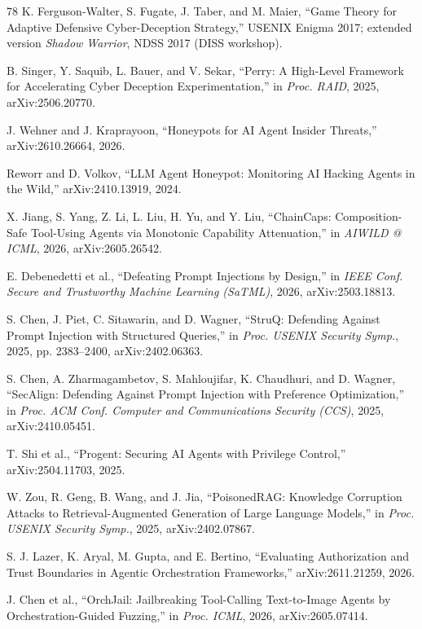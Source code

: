 \begin{thebibliography}{78}
K. Ferguson-Walter, S. Fugate, J. Taber, and M. Maier, ``Game Theory for
Adaptive Defensive Cyber-Deception Strategy,'' USENIX Enigma 2017; extended
version \emph{Shadow Warrior}, NDSS 2017 (DISS workshop).

B. Singer, Y. Saquib, L. Bauer, and V. Sekar, ``Perry: A High-Level Framework
for Accelerating Cyber Deception Experimentation,'' in \emph{Proc. RAID},
2025, arXiv:2506.20770.

J. Wehner and J. Kraprayoon, ``Honeypots for AI Agent Insider Threats,''
arXiv:2610.26664, 2026.

Reworr and D. Volkov, ``LLM Agent Honeypot: Monitoring AI Hacking Agents in
the Wild,'' arXiv:2410.13919, 2024.

X. Jiang, S. Yang, Z. Li, L. Liu, H. Yu, and Y. Liu, ``ChainCaps:
Composition-Safe Tool-Using Agents via Monotonic Capability Attenuation,''
in \emph{AIWILD @ ICML}, 2026, arXiv:2605.26542.

E. Debenedetti et al., ``Defeating Prompt Injections by Design,'' in
\emph{IEEE Conf. Secure and Trustworthy Machine Learning (SaTML)}, 2026,
arXiv:2503.18813.

S. Chen, J. Piet, C. Sitawarin, and D. Wagner, ``StruQ: Defending Against
Prompt Injection with Structured Queries,'' in \emph{Proc. USENIX Security
Symp.}, 2025, pp. 2383--2400, arXiv:2402.06363.

S. Chen, A. Zharmagambetov, S. Mahloujifar, K. Chaudhuri, and D. Wagner,
``SecAlign: Defending Against Prompt Injection with Preference Optimization,''
in \emph{Proc. ACM Conf. Computer and Communications Security (CCS)}, 2025,
arXiv:2410.05451.

T. Shi et al., ``Progent: Securing AI Agents with Privilege Control,''
arXiv:2504.11703, 2025.

W. Zou, R. Geng, B. Wang, and J. Jia, ``PoisonedRAG: Knowledge Corruption
Attacks to Retrieval-Augmented Generation of Large Language Models,'' in
\emph{Proc. USENIX Security Symp.}, 2025, arXiv:2402.07867.

S. J. Lazer, K. Aryal, M. Gupta, and E. Bertino, ``Evaluating Authorization
and Trust Boundaries in Agentic Orchestration Frameworks,'' arXiv:2611.21259,
2026.

J. Chen et al., ``OrchJail: Jailbreaking Tool-Calling Text-to-Image Agents by
Orchestration-Guided Fuzzing,'' in \emph{Proc. ICML}, 2026, arXiv:2605.07414.


\end{thebibliography}
